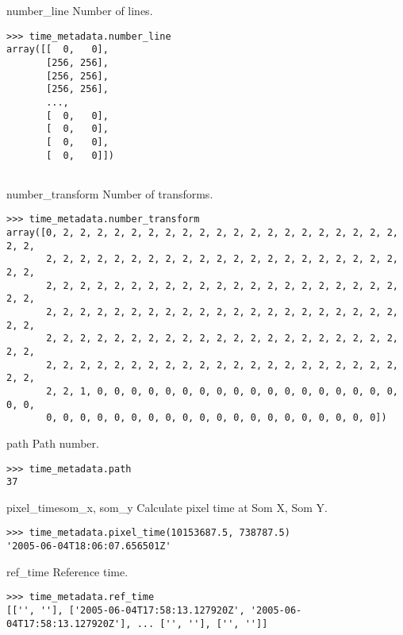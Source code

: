\documentclass{howto}
\begin{document}
\begin{memberdesc}[int]{number_line}
  Number of lines.
  
\begin{verbatim}
>>> time_metadata.number_line
array([[  0,   0],
       [256, 256],
       [256, 256],
       [256, 256],
       ...,
       [  0,   0],
       [  0,   0],
       [  0,   0],
       [  0,   0]])
       
\end{verbatim}
\end{memberdesc}

\begin{memberdesc}[int]{number_transform}
  Number of transforms.
  
\begin{verbatim}
>>> time_metadata.number_transform
array([0, 2, 2, 2, 2, 2, 2, 2, 2, 2, 2, 2, 2, 2, 2, 2, 2, 2, 2, 2, 2, 2, 2,
       2, 2, 2, 2, 2, 2, 2, 2, 2, 2, 2, 2, 2, 2, 2, 2, 2, 2, 2, 2, 2, 2, 2,
       2, 2, 2, 2, 2, 2, 2, 2, 2, 2, 2, 2, 2, 2, 2, 2, 2, 2, 2, 2, 2, 2, 2,
       2, 2, 2, 2, 2, 2, 2, 2, 2, 2, 2, 2, 2, 2, 2, 2, 2, 2, 2, 2, 2, 2, 2,
       2, 2, 2, 2, 2, 2, 2, 2, 2, 2, 2, 2, 2, 2, 2, 2, 2, 2, 2, 2, 2, 2, 2,
       2, 2, 2, 2, 2, 2, 2, 2, 2, 2, 2, 2, 2, 2, 2, 2, 2, 2, 2, 2, 2, 2, 2,
       2, 2, 1, 0, 0, 0, 0, 0, 0, 0, 0, 0, 0, 0, 0, 0, 0, 0, 0, 0, 0, 0, 0,
       0, 0, 0, 0, 0, 0, 0, 0, 0, 0, 0, 0, 0, 0, 0, 0, 0, 0, 0, 0])
\end{verbatim}
\end{memberdesc}

\begin{memberdesc}[int]{path}
  Path number.
  
\begin{verbatim}
>>> time_metadata.path
37
\end{verbatim}
\end{memberdesc}

\begin{methoddesc}{pixel_time}{som_x, som_y}
  Calculate pixel time at Som X, Som Y.

\begin{verbatim}
>>> time_metadata.pixel_time(10153687.5, 738787.5)
'2005-06-04T18:06:07.656501Z'
\end{verbatim}
\end{methoddesc}

\begin{memberdesc}[char]{ref_time} 
  Reference time.

\begin{verbatim}
>>> time_metadata.ref_time
[['', ''], ['2005-06-04T17:58:13.127920Z', '2005-06-04T17:58:13.127920Z'], ... ['', ''], ['', '']]
\end{verbatim}
\end{memberdesc}
\end{document}
